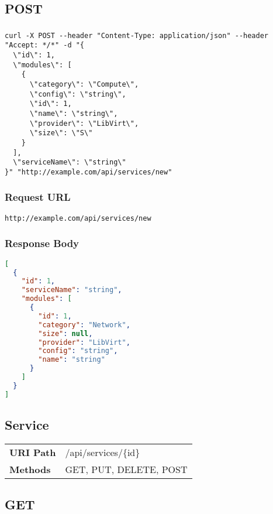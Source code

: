 \subsection{POST}
\subsubsection{}
\begin{lstlisting}[style=Bash] 
curl -X POST --header "Content-Type: application/json" --header "Accept: */*" -d "{
  \"id\": 1,
  \"modules\": [
    {
      \"category\": \"Compute\",
      \"config\": \"string\",
      \"id\": 1,
      \"name\": \"string\",
      \"provider\": \"LibVirt\",
      \"size\": \"S\"
    }
  ],
  \"serviceName\": \"string\"
}" "http://example.com/api/services/new"
\end{lstlisting}

\subsubsection{Request URL}
\begin{lstlisting}[] 
http://example.com/api/services/new
\end{lstlisting}

\subsubsection{Response Body}
\begin{lstlisting}[language=json] 
[
  {
    "id": 1,
    "serviceName": "string",
    "modules": [
      {
        "id": 1,
        "category": "Network",
        "size": null,
        "provider": "LibVirt",
        "config": "string",
        "name": "string"
      }
    ]
  }
]
\end{lstlisting}





\subsection{Service}
\begin{tabularx}{\linewidth}{l l}
\textbf{URI Path} & /api/services/\{id\}\\
\textbf{Methods} & GET, PUT, DELETE, POST\\
\end{tabularx}

\subsection{GET}
